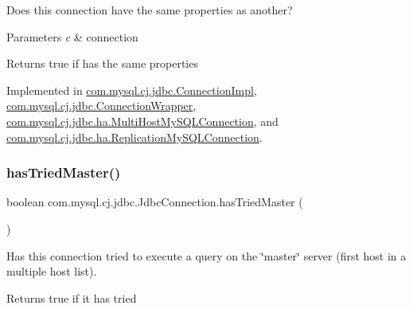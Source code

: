 Does this connection have the same properties as another?


\begin{DoxyParams}{Parameters}
{\em c} & connection \\
\hline
\end{DoxyParams}
\begin{DoxyReturn}{Returns}
true if has the same properties 
\end{DoxyReturn}


Implemented in \mbox{\hyperlink{classcom_1_1mysql_1_1cj_1_1jdbc_1_1_connection_impl_a498f67a53c8188e4827e838ed9dd3356}{com.\+mysql.\+cj.\+jdbc.\+Connection\+Impl}}, \mbox{\hyperlink{classcom_1_1mysql_1_1cj_1_1jdbc_1_1_connection_wrapper_a10dadfff0a559ba28835c1a0e95379d6}{com.\+mysql.\+cj.\+jdbc.\+Connection\+Wrapper}}, \mbox{\hyperlink{classcom_1_1mysql_1_1cj_1_1jdbc_1_1ha_1_1_multi_host_my_s_q_l_connection_a149e10365c36e34d7585bc42515e2fcf}{com.\+mysql.\+cj.\+jdbc.\+ha.\+Multi\+Host\+My\+S\+Q\+L\+Connection}}, and \mbox{\hyperlink{classcom_1_1mysql_1_1cj_1_1jdbc_1_1ha_1_1_replication_my_s_q_l_connection_abceb3d3792b7bb70f6ba4f38c5c4a048}{com.\+mysql.\+cj.\+jdbc.\+ha.\+Replication\+My\+S\+Q\+L\+Connection}}.

\mbox{\label{interfacecom_1_1mysql_1_1cj_1_1jdbc_1_1_jdbc_connection_ab7d858b77e30de81f7ec67504ba89b0c}} 
\subsubsection{\texorpdfstring{has\+Tried\+Master()}{hasTriedMaster()}}
{\footnotesize\ttfamily boolean com.\+mysql.\+cj.\+jdbc.\+Jdbc\+Connection.\+has\+Tried\+Master (\begin{DoxyParamCaption}{ }\end{DoxyParamCaption})}

Has this connection tried to execute a query on the \char`\"{}master\char`\"{} server (first host in a multiple host list).

\begin{DoxyReturn}{Returns}
true if it has tried 
\end{DoxyReturn}


